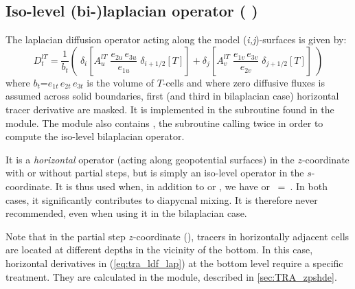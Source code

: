 \documentclass[../main/NEMO_manual]{subfiles}
\begin{document}
\subsection{Iso-level (bi-)laplacian operator ( \protect{}) }
\label{subsec:TRA_ldf_lev}

The laplacian diffusion operator acting along the model (\textit{i,j})-surfaces is given by: 
\begin{equation}
  \label{eq:tra_ldf_lap}
  D_t^{lT} =\frac{1}{b_t} \left( \;
    \delta_{i}\left[ A_u^{lT} \; \frac{e_{2u}\,e_{3u}}{e_{1u}} \;\delta_{i+1/2} [T] \right]
    + \delta_{j}\left[ A_v^{lT} \;  \frac{e_{1v}\,e_{3v}}{e_{2v}} \;\delta_{j+1/2} [T] \right]  \;\right)
\end{equation}
where  $b_t$=$e_{1t}\,e_{2t}\,e_{3t}$  is the volume of $T$-cells and
where zero diffusive fluxes is assumed across solid boundaries,
first (and third in bilaplacian case) horizontal tracer derivative are masked.
It is implemented in the  subroutine found in the  module.
The module also contains , the subroutine calling twice  in order to
compute the iso-level bilaplacian operator. 

It is a \emph{horizontal} operator (\ie acting along geopotential surfaces) in
the $z$-coordinate with or without partial steps, but is simply an iso-level operator in the $s$-coordinate.
It is thus used when, in addition to  or ,
we have  or ~=~.
In both cases, it significantly contributes to diapycnal mixing.
It is therefore never recommended, even when using it in the bilaplacian case.

Note that in the partial step $z$-coordinate (),
tracers in horizontally adjacent cells are located at different depths in the vicinity of the bottom.
In this case, horizontal derivatives in (\autoref{eq:tra_ldf_lap}) at the bottom level require a specific treatment.
They are calculated in the  module, described in \autoref{sec:TRA_zpshde}.


\end{document}
